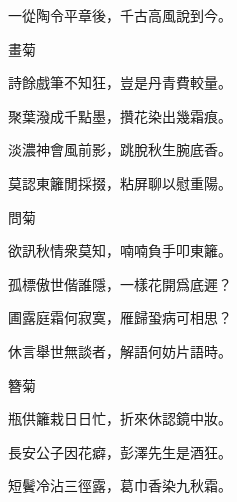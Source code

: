 \begin{poem}
    \begin{pl}一從陶令平章後，千古高風說到今。\end{pl}
    \emptypl

    \begin{pl}畫菊　\end{pl}

    \begin{pl}詩餘戲筆不知狂，豈是丹青費較量。\end{pl}

    \begin{pl}聚葉潑成千點墨，攢花染出幾霜痕。\end{pl}

    \begin{pl}淡濃神會風前影，跳脫秋生腕底香。\end{pl}

    \begin{pl}莫認東籬閒採掇，粘屏聊以慰重陽。\end{pl}
    \emptypl

    \begin{pl}問菊　\end{pl}

    \begin{pl}欲訊秋情衆莫知，喃喃負手叩東籬。\end{pl}

    \begin{pl}孤標傲世偕誰隱，一樣花開爲底遲？\end{pl}

    \begin{pl}圃露庭霜何寂寞，雁歸蛩病可相思？\end{pl}

    \begin{pl}休言舉世無談者，解語何妨片語時。\end{pl}
    \emptypl

    \begin{pl}簪菊　\end{pl}

    \begin{pl}瓶供籬栽日日忙，折來休認鏡中妝。\end{pl}

    \begin{pl}長安公子因花癖，彭澤先生是酒狂。\end{pl}

    \begin{pl}短鬢冷沾三徑露，葛巾香染九秋霜。\end{pl}


\end{poem}
